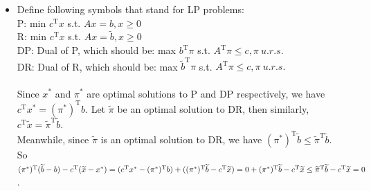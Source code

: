 \documentclass{article}
\begin{document}
	\begin{itemize}
		\item [2. b)]
		Define following symbols that stand for LP problems:\\
		P: min $c^\mathrm{T}x$ s.t. $Ax=b,x\geq0$\\
		R: min $c^\mathrm{T}x$ s.t. $Ax=\widetilde{b},x\geq0$\\
		DP: Dual of P, which should be: max $b^\mathrm{T}\pi$ s.t. $A^\mathrm{T}\pi\leq c,\pi~u.r.s.$\\
		DR: Dual of R, which should be: max $\widetilde{b}^\mathrm{T}\pi$ s.t. $A^\mathrm{T}\pi\leq c,\pi~u.r.s.$\\ \\
			
		Since $x^*$ and $\pi ^*$ are optimal solutions to P and DP respectively, we have $c^\mathrm{T}x^*=(\pi ^*)^\mathrm{T}b$.
		Let $\widetilde{\pi}$ be an optimal solution to DR, then similarly, $c^\mathrm{T}\widetilde{x}=\widetilde{\pi}^\mathrm{T}\widetilde{b}$.\\
		Meanwhile, since $\widetilde{\pi}$ is an optimal solution to DR, we have $(\pi ^*)^\mathrm{T}\widetilde{b} \leq \widetilde{\pi}^\mathrm{T}\widetilde{b}$.\\
		So $(\pi ^*)^\mathrm{T}(\widetilde{b}-b)-c^\mathrm{T}(\widetilde{x}-x^*)\\
		=(c^\mathrm{T}x^*-(\pi ^*)^\mathrm{T}b)+((\pi ^*)^\mathrm{T}\widetilde{b}-c^\mathrm{T}\widetilde{x})\\
		=0+(\pi ^*)^\mathrm{T}\widetilde{b}-c^\mathrm{T}\widetilde{x}\\
		\leq\widetilde{\pi}^\mathrm{T}\widetilde{b}-c^\mathrm{T}\widetilde{x}\\
		=0$.
	\end{itemize}
\end{document}
